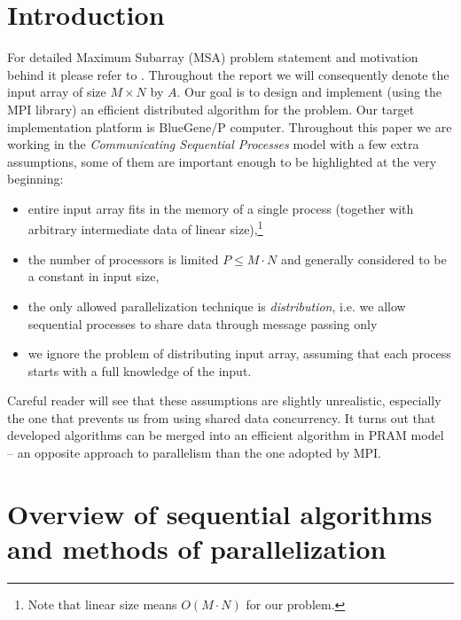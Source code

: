 




\section*{Introduction}

For detailed Maximum Subarray (MSA) problem statement and motivation behind it please refer to \cite{Pearls}.
Throughout the report we  will consequently denote the input array of size $M \times N$ by $A$.
Our goal is to design and implement (using the MPI library) an efficient distributed algorithm for the problem.
Our target implementation platform is BlueGene/P computer.
Throughout this paper we are working in the \emph{Communicating Sequential Processes} model with a few extra assumptions, some of them are important enough to be highlighted at the very beginning:
\begin{itemize}
    \item entire input array fits in the memory of a single process (together with arbitrary intermediate data of linear size),\footnote{Note that linear size means $O(M \cdot N)$ for our problem.}
    \item the number of processors is limited $P \leq M \cdot N$ and generally considered to be a constant in input size,
    \item the only allowed parallelization technique is \emph{distribution}, i.e. we allow sequential processes to share data through message passing only
    \item we ignore the problem of distributing input array, assuming that each process starts with a full knowledge of the input.
\end{itemize}

Careful reader will see that these assumptions are slightly unrealistic, especially the one that prevents us from using shared data concurrency.
It turns out that developed algorithms can be merged into an efficient algorithm in PRAM model -- an opposite approach to parallelism than the one adopted by MPI.

\section*{Overview of sequential algorithms and methods of parallelization}

